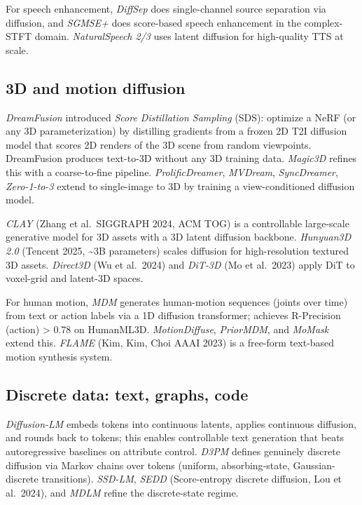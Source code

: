 \documentclass{article}
\begin{document}
For speech enhancement, \emph{DiffSep} \citep{scheibler20232023} does single-channel source separation via diffusion, and \emph{SGMSE+} \citep{welker2022speechenhancementw} does score-based speech enhancement in the complex-STFT domain. \emph{NaturalSpeech 2/3} uses latent diffusion for high-quality TTS at scale.

\subsection{3D and motion diffusion}\label{d-and-motion-diffusion}

\emph{DreamFusion} \citep{poole2023dreamfusiontextto3} introduced \emph{Score Distillation Sampling} (SDS): optimize a NeRF (or any 3D parameterization) by distilling gradients from a frozen 2D T2I diffusion model that scores 2D renders of the 3D scene from random viewpoints. DreamFusion produces text-to-3D without any 3D training data. \emph{Magic3D} \citep{lin2023diffusionmodelsfor} refines this with a coarse-to-fine pipeline. \emph{ProlificDreamer}, \emph{MVDream}, \emph{SyncDreamer}, \emph{Zero-1-to-3} \citep{liu2023zero1to3zeroshoton} extend to single-image to 3D by training a view-conditioned diffusion model.

\emph{CLAY} (Zhang et al.~SIGGRAPH 2024, ACM TOG) is a controllable large-scale generative model for 3D assets with a 3D latent diffusion backbone. \emph{Hunyuan3D 2.0} (Tencent 2025, \textasciitilde3B parameters) scales diffusion for high-resolution textured 3D assets. \emph{Direct3D} (Wu et al.~2024) and \emph{DiT-3D} (Mo et al.~2023) apply DiT to voxel-grid and latent-3D spaces.

For human motion, \emph{MDM} \citep{tevet2023humanmotiondiffusi} generates human-motion sequences (joints over time) from text or action labels via a 1D diffusion transformer; achieves R-Precision (action) \textgreater{} 0.78 on HumanML3D. \emph{MotionDiffuse}, \emph{PriorMDM}, and \emph{MoMask} extend this. \emph{FLAME} (Kim, Kim, Choi AAAI 2023) is a free-form text-based motion synthesis system.

\subsection{Discrete data: text, graphs, code}\label{discrete-data-text-graphs-code}

\emph{Diffusion-LM} \citep{li2022diffusionlmimprove} embeds tokens into continuous latents, applies continuous diffusion, and rounds back to tokens; this enables controllable text generation that beats autoregressive baselines on attribute control. \emph{D3PM} \citep{austin2021structureddenoisin} defines genuinely discrete diffusion via Markov chains over tokens (uniform, absorbing-state, Gaussian-discrete transitions). \emph{SSD-LM}, \emph{SEDD} (Score-entropy discrete diffusion, Lou et al.~2024), and \emph{MDLM} refine the discrete-state regime.
\end{document}
